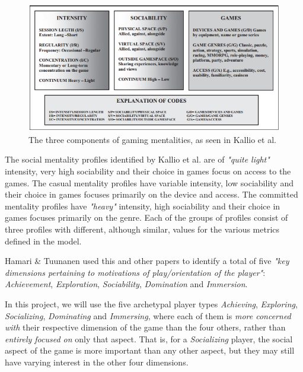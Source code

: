 \begin{figure}[h]
	\centering
	\includegraphics[width=\textwidth]{Figures/kallio-gaming-mentalities-model}
	\caption{The three components of gaming mentalities, as seen in Kallio et al. \cite{kallio2011gamermentalities}}
	\label{fig:kallio-gamer-mentalities-model}
\end{figure}

The social mentality profiles identified by Kallio et al. are of \emph{"quite light"} intensity, very high sociability and their choice in games focus on access to the games. The casual mentality profiles have variable intensity, low sociability and their choice in games focuses primarily on the device and access. The committed mentality profiles have \emph{"heavy"} intensity, high sociability and their choice in games focuses primarily on the genre. Each of the groups of profiles consist of three profiles with different, although similar, values for the various metrics defined in the model.

Hamari \& Tuunanen \cite{hamari2014playertypes} used this and other papers to identify a total of five \emph{"key dimensions pertaining to motivations of play/orientation of the player"}: \emph{Achievement}, \emph{Exploration}, \emph{Sociability}, \emph{Domination} and \emph{Immersion}.

In this project, we will use the five archetypal player types \emph{Achieving}, \emph{Exploring}, \emph{Socializing}, \emph{Dominating} and \emph{Immersing}, where each of them is \emph{more concerned with} their respective dimension of the game than the four others, rather than \emph{entirely focused on} only that aspect. That is, for a \emph{Socializing} player, the social aspect of the game is more important than any other aspect, but they may still have varying interest in the other four dimensions.


